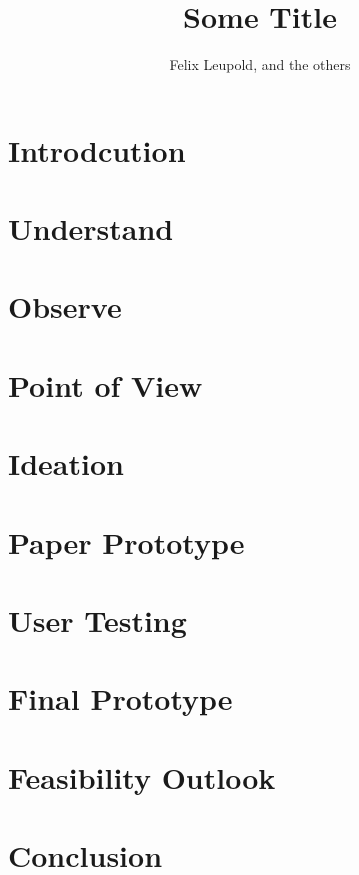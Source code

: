 \documentclass[runningheads]{llncs}
\begin{document}
\title{Some Title}
\author{Felix Leupold, and the others}
\maketitle

\newpage


\section{Introdcution} %

\section{Understand}

\section{Observe}

\section{Point of View}

\section{Ideation}

\section{Paper Prototype}

\section{User Testing}

\section{Final Prototype}

\section{Feasibility Outlook}

\section{Conclusion}


%

\end{document}
